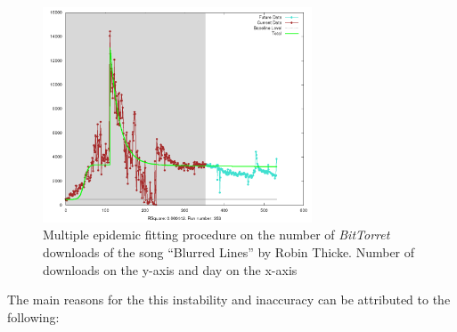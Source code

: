 \begin{centering}
\begin{figure}[h!]
  \includegraphics[width=8cm]{images/multi/badrt4.png}
  \caption{Multiple epidemic fitting procedure on the number of
    \emph{BitTorret} downloads of the song ``Blurred Lines'' by Robin
    Thicke. Number of downloads on the y-axis and day on the x-axis}
\label{fig:rt1}
  \end{figure}
\end{centering}

The main reasons for the this instability and inaccuracy can be
attributed to the following:


